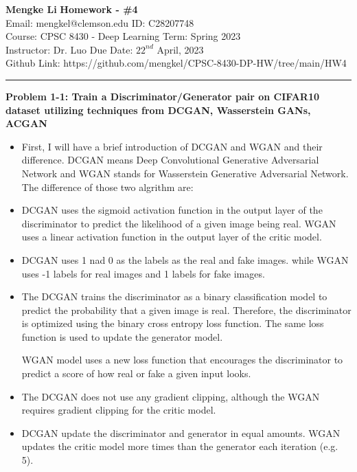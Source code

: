 \documentclass[a4paper, 11pt]{article}
\newenvironment{problem}[2][Problem]
    { \begin{mdframed}[backgroundcolor=gray!20] \textbf{#1 #2} \\}
    {  \end{mdframed}}
\begin{document}
\noindent
\large\textbf{Mengke Li} \hfill \textbf{Homework - \#4}   \\
Email: mengkel@clemson.edu \hfill ID: C28207748 \\
\normalsize Course: CPSC 8430 - Deep Learning \hfill Term: Spring 2023\\
Instructor: Dr. Luo \hfill Due Date: $22^{nd}$ April, 2023 \\
Github Link: https://github.com/mengkel/CPSC-8430-DP-HW/tree/main/HW4 \\
\noindent\rule{7in}{2.8pt}
\begin{problem}{1-1: Train a Discriminator/Generator pair on CIFAR10 dataset utilizing techniques from DCGAN, Wasserstein GANs,
ACGAN}
\end{problem}
\begin{itemize}
\item First, I will have a brief introduction of DCGAN and WGAN and their difference.
DCGAN means Deep Convolutional Generative Adversarial Network and WGAN stands for Wasserstein Generative Adversarial Network. The difference of those two algrithm are:

\item[1]
DCGAN uses the sigmoid activation function in the output layer of the discriminator to predict the likelihood of a given image being real. WGAN uses a linear activation function in the output layer of the critic model.
\item[2]
DCGAN uses 1 nad 0 as the labels as the real and fake images. while WGAN uses -1 labels for real images and 1 labels for fake images.
\item[3]

The DCGAN trains the discriminator as a binary classification model to predict the probability that a given image is real. Therefore, the discriminator is optimized using the binary cross entropy loss function. The same loss function is used to update the generator model.

WGAN model uses a new loss function that encourages the discriminator to predict a score of how real or fake a given input looks.

\item[4]
The DCGAN does not use any gradient clipping, although the WGAN requires gradient clipping for the critic model.

\item[5]
DCGAN update the discriminator and generator in equal amounts. 
WGAN updates the critic model more times than the generator each iteration (e.g. 5).

\end{itemize}
\end{document}
